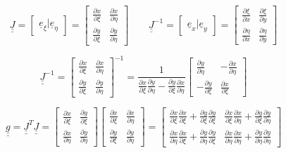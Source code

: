\documentclass[a4paper]{jpconf}
\begin{document}
\begin{equation}
\underline{\underline{J}}=\begin{bmatrix}
\underline{e}_{\xi}|\underline{e}_{\eta}
\end{bmatrix}=\begin{bmatrix}
\frac{\partial x}{\partial\xi}&\frac{\partial x}{\partial\eta}\\\frac{\partial y}{\partial\xi}&\frac{\partial y}{\partial\eta}
\end{bmatrix}\qquad\underline{\underline{J}}^{-1}=\begin{bmatrix}
\underline{e}_{x}|\underline{e}_{y}
\end{bmatrix}=\begin{bmatrix}
\frac{\partial \xi}{\partial x}&\frac{\partial \xi}{\partial y}\\\frac{\partial \eta}{\partial x}&\frac{\partial \eta}{\partial y}
\end{bmatrix}
\end{equation}

\begin{equation}
\underline{\underline{J}}^{-1}=\begin{bmatrix}
\frac{\partial x}{\partial\xi}&\frac{\partial x}{\partial\eta}\\\frac{\partial y}{\partial\xi}&\frac{\partial y}{\partial\eta}
\end{bmatrix}^{-1}=\frac{1}{\frac{\partial x}{\partial\xi}\frac{\partial y}{\partial\eta}-\frac{\partial y}{\partial\xi}\frac{\partial x}{\partial\eta}}\begin{bmatrix}
\frac{\partial y}{\partial\eta}&-\frac{\partial x}{\partial\eta}\\-\frac{\partial y}{\partial\xi}&\frac{\partial x}{\partial\xi}
\end{bmatrix}
\end{equation}

\begin{equation}
\underline{\underline{g}}=\underline{\underline{J}}^{T}\underline{\underline{J}}=\begin{bmatrix}
\frac{\partial x}{\partial\xi}&\frac{\partial y}{\partial\xi}\\\frac{\partial x}{\partial\eta}&\frac{\partial y}{\partial\eta}
\end{bmatrix}\begin{bmatrix}
\frac{\partial x}{\partial\xi}&\frac{\partial x}{\partial\eta}\\\frac{\partial y}{\partial\xi}&\frac{\partial y}{\partial\eta}
\end{bmatrix}=\begin{bmatrix}
\frac{\partial x}{\partial\xi}\frac{\partial x}{\partial\xi}+\frac{\partial y}{\partial\xi}\frac{\partial y}{\partial\xi}&\frac{\partial x}{\partial\xi}\frac{\partial x}{\partial\eta}+\frac{\partial y}{\partial\xi}\frac{\partial y}{\partial\eta}\\\frac{\partial x}{\partial\eta}\frac{\partial x}{\partial\xi}+\frac{\partial y}{\partial\eta}\frac{\partial y}{\partial\xi}&\frac{\partial x}{\partial\eta}\frac{\partial x}{\partial\eta}+\frac{\partial y}{\partial\eta}\frac{\partial y}{\partial\eta}
\end{bmatrix}
\end{equation}
\end{document}
